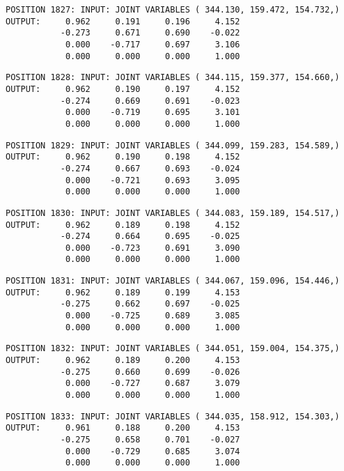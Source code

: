 \begin{verbatim}
POSITION 1827: INPUT: JOINT VARIABLES ( 344.130, 159.472, 154.732,)
OUTPUT:     0.962     0.191     0.196     4.152
           -0.273     0.671     0.690    -0.022
            0.000    -0.717     0.697     3.106
            0.000     0.000     0.000     1.000
\end{verbatim} \pagebreak[1]\begin{verbatim}
POSITION 1828: INPUT: JOINT VARIABLES ( 344.115, 159.377, 154.660,)
OUTPUT:     0.962     0.190     0.197     4.152
           -0.274     0.669     0.691    -0.023
            0.000    -0.719     0.695     3.101
            0.000     0.000     0.000     1.000
\end{verbatim} \pagebreak[1]\begin{verbatim}
POSITION 1829: INPUT: JOINT VARIABLES ( 344.099, 159.283, 154.589,)
OUTPUT:     0.962     0.190     0.198     4.152
           -0.274     0.667     0.693    -0.024
            0.000    -0.721     0.693     3.095
            0.000     0.000     0.000     1.000
\end{verbatim} \pagebreak[1]\begin{verbatim}
POSITION 1830: INPUT: JOINT VARIABLES ( 344.083, 159.189, 154.517,)
OUTPUT:     0.962     0.189     0.198     4.152
           -0.274     0.664     0.695    -0.025
            0.000    -0.723     0.691     3.090
            0.000     0.000     0.000     1.000
\end{verbatim} \pagebreak[1]\begin{verbatim}
POSITION 1831: INPUT: JOINT VARIABLES ( 344.067, 159.096, 154.446,)
OUTPUT:     0.962     0.189     0.199     4.153
           -0.275     0.662     0.697    -0.025
            0.000    -0.725     0.689     3.085
            0.000     0.000     0.000     1.000
\end{verbatim} \pagebreak[1]\begin{verbatim}
POSITION 1832: INPUT: JOINT VARIABLES ( 344.051, 159.004, 154.375,)
OUTPUT:     0.962     0.189     0.200     4.153
           -0.275     0.660     0.699    -0.026
            0.000    -0.727     0.687     3.079
            0.000     0.000     0.000     1.000
\end{verbatim} \pagebreak[1]\begin{verbatim}
POSITION 1833: INPUT: JOINT VARIABLES ( 344.035, 158.912, 154.303,)
OUTPUT:     0.961     0.188     0.200     4.153
           -0.275     0.658     0.701    -0.027
            0.000    -0.729     0.685     3.074
            0.000     0.000     0.000     1.000
\end{verbatim} \pagebreak[1]\begin{verbatim}

\end{verbatim}
